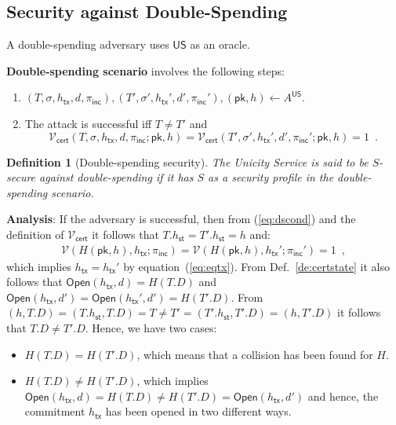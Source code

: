 \documentclass{article}
\newtheorem{definition}{Definition}[section]
\newcommand{\pubkey}[0]{\mathsf{pk}}
\newcommand{\open}[0]{\mathsf{Open}}
\newcommand{\unisrv}[0]{\mathsf{US}}
\newcommand{\sthash}[0]{{h_\mathsf{st}}}
\newcommand{\txhash}[0]{{h_\mathsf{tx}}}
\newcommand{\univer}[0]{\mathcal{V}}
\newcommand{\certver}[0]{{\mathcal{V}_\mathsf{cert}}}
\newcommand{\pinc}[0]{{\pi_{\mathsf{inc}}}}
\begin{document}
\subsection{Security against Double-Spending}\label{sec:double-spending}

A double-spending adversary uses $\unisrv$ as an oracle. \medskip

\noindent\textbf{Double-spending scenario} involves the following steps:
\begin{enumerate}
\item $(T,\sigma,\txhash,d,\pinc),(T',\sigma',\txhash',d',\pinc'),(\pubkey,h)\gets A^\unisrv$.
\item The attack is successful iff $T\neq T'$ and
\begin{equation}\label{eq:dscond}
\certver(T,\sigma,\txhash,d,\pinc;\pubkey,h)=\certver(T',\sigma',\txhash',d',\pinc';\pubkey,h)=1 \enspace.
\end{equation}
\end{enumerate}

\begin{definition}[Double-spending security]
The Unicity Service is said to be $S$-secure against double-spending if it has $S$ as a security profile in the double-spending scenario.
\end{definition}

\noindent\textbf{Analysis}: If the adversary is successful, then
from (\ref{eq:dscond}) and the definition of $\certver$ it follows that
$T.\sthash = T'.\sthash=h$ and:
\begin{eqnarray*}
\univer(H(\pubkey, h), \txhash; \pinc) = \univer(H(\pubkey, h), \txhash'; \pinc') = 1\enspace,
\end{eqnarray*}
which implies $\txhash=\txhash'$ by equation~(\ref{eq:eqtx}).
From Def.~\ref{de:certstate} it also follows that
$\open(\txhash,d)=H(T.D)$ and $\open(\txhash,d')=\open(\txhash',d')=H(T'.D)$.
From $(h,T.D)=(T.\sthash,T.D)=T\neq T'=(T'.\sthash,T'.D)=(h,T'.D)$ it follows that $T.D\neq T'.D$. Hence, we have two cases:
\begin{itemize}
\item[a)] $H(T.D)=H(T'.D)$, which
means that a collision has been found for $H$.
\item[b)] $H(T.D)\neq H(T'.D)$, which implies $\open(\txhash,d)=H(T.D)\neq H(T'.D)=\open(\txhash,d')$ and hence, the commitment $\txhash$ has been opened in two different ways.
\end{itemize}
\end{document}
